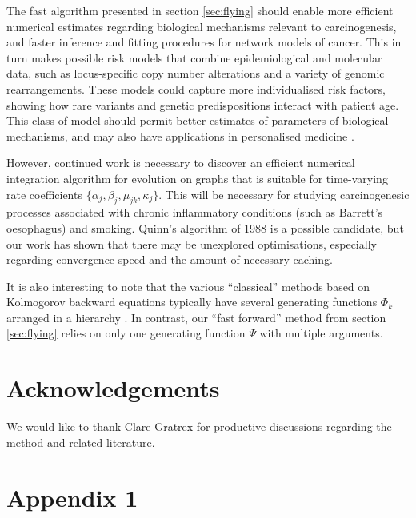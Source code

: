 \documentclass{article}
\begin{document}
The fast algorithm presented in section \ref{sec:flying} should enable more efficient numerical
estimates regarding biological mechanisms relevant to carcinogenesis, and faster
inference and fitting procedures for network models of cancer. This in turn
makes possible risk models that combine epidemiological and molecular data, such as locus-specific copy number
alterations and a variety of genomic rearrangements. These models could
capture more individualised risk factors, showing how rare variants and genetic predispositions interact
with patient age. This class of model should permit better estimates of
parameters of biological mechanisms, and may also have applications in
personalised medicine \cite{patersonbozic2020colorectal}.

However, continued work is necessary to discover an efficient numerical integration algorithm for
evolution on graphs that is suitable for time-varying rate coefficients $\{\alpha_j,
\beta_j, \mu_{jk}, \kappa_j\}$. This will be necessary for studying
carcinogenesic processes associated with chronic inflammatory conditions (such as
Barrett's oesophagus) and smoking. Quinn's algorithm of 1988 is a possible candidate, but our work has
shown that there may be unexplored optimisations, especially regarding
convergence speed and the amount of necessary caching.

It is also interesting to note that the various ``classical'' methods based on
Kolmogorov backward equations typically have several generating functions $\Phi_k$
arranged in a hierarchy \cite{luebeck2013impact,zhang2022waiting,donotcite}. 
In contrast, our ``fast forward'' method from section \ref{sec:flying} relies on only one generating function $\Psi$ with multiple arguments. 

\section{Acknowledgements}

We would like to thank Clare Gratrex for productive discussions regarding the
method and related literature. %






\section{Appendix 1}
\end{document}
